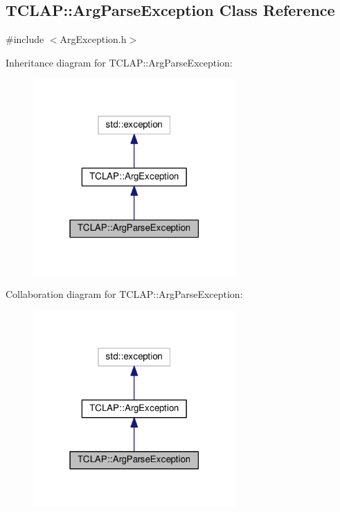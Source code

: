 \hypertarget{classTCLAP_1_1ArgParseException}{}\subsection{T\+C\+L\+AP\+:\+:Arg\+Parse\+Exception Class Reference}
\label{classTCLAP_1_1ArgParseException}


{\ttfamily \#include $<$Arg\+Exception.\+h$>$}



Inheritance diagram for T\+C\+L\+AP\+:\+:Arg\+Parse\+Exception\+:
\nopagebreak
\begin{figure}[H]
\begin{center}
\leavevmode
\includegraphics[width=219pt]{classTCLAP_1_1ArgParseException__inherit__graph}
\end{center}
\end{figure}


Collaboration diagram for T\+C\+L\+AP\+:\+:Arg\+Parse\+Exception\+:
\nopagebreak
\begin{figure}[H]
\begin{center}
\leavevmode
\includegraphics[width=219pt]{classTCLAP_1_1ArgParseException__coll__graph}
\end{center}
\end{figure}
